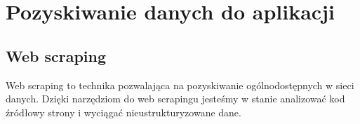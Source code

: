 \chapter{Pozyskiwanie danych do aplikacji}

\section{Web scraping}
Web scraping to technika pozwalająca na pozyskiwanie ogólnodostępnych w sieci danych. Dzięki narzędziom do web scrapingu jesteśmy w stanie analizować kod źródłowy strony i wyciągać nieustrukturyzowane dane.